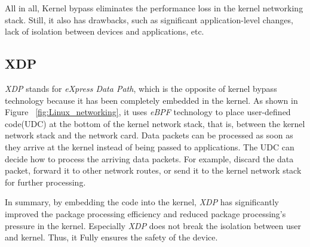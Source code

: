 All in all, Kernel bypass eliminates the performance 
loss in the kernel networking stack. Still, it also has 
drawbacks, such as significant application-level changes, 
lack of isolation between devices and applications, etc.

\subsection{XDP}
\emph{XDP}\cite{10.1145/3281411.3281443} stands for \emph{eXpress Data Path}, which is the opposite of 
kernel bypass technology because it has been completely embedded 
in the kernel. As shown in Figure ~\ref{fig:Linux_networking}, 
it uses \emph{eBPF} technology to place user-defined code(UDC) at the 
bottom of the kernel network stack, that is, between the kernel 
network stack and the network card. 
Data packets can be processed as soon as they arrive at the kernel 
instead of being passed to applications. The UDC can decide how to 
process the arriving data packets. For example, 
discard the data packet, forward it to other network 
routes, or send it to the kernel network stack for further processing.

In summary, by embedding the code into the kernel, 
\emph{XDP} has significantly improved the package processing 
efficiency and reduced package processing's pressure 
in the kernel. Especially \emph{XDP} does not break the isolation 
between user and kernel. Thus, it Fully ensures the safety of the device.

\cleardoublepage

